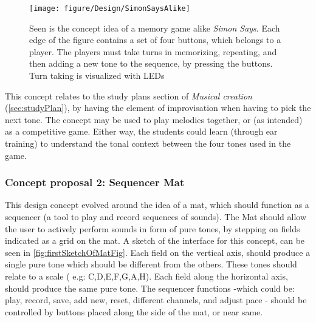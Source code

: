 \begin{figure}[H]
	\centering
	\texttt{[image: figure/Design/SimonSaysAlike]} 
	\caption{Seen is the concept idea of a memory game alike \textit{Simon Says}. Each edge of the figure contains a set of four buttons, which belongs to a player. The players must take turns in memorizing, repeating, and then adding a new tone to the sequence, by pressing the buttons. Turn taking is visualized with LEDs}
	\label{fig:SimonSaysAlike}
\end{figure}

This concept relates to the study plans section of \textit{Musical creation }(\autoref{sec:studyPlan}), by having the element of improvisation when having to pick the next tone. The concept may be used to play melodies together, or (as intended) as a competitive game. Either way, the students could learn (through ear training) to understand the tonal context between the four tones used in the game.   

\subsubsection{Concept proposal 2: Sequencer Mat}\label{sequencerMat}
This design concept evolved around the idea of a mat, which should function as a sequencer (a tool to play and record sequences of sounds). The Mat should allow the user to actively perform sounds in form of pure tones, by stepping on fields indicated as a grid on the mat. A sketch of the interface for this concept, can be seen in \autoref{fig:firstSketchOfMatFig}. Each field on the vertical axis, should produce a single pure tone which should be different from the others. These tones should relate to a scale ( e.g:  C,D,E,F,G,A,H). Each field along the horizontal axis, should produce the same pure tone. The sequencer functions -which could be: play, record, save, add new, reset, different channels, and adjust pace - should be controlled by buttons placed along the side of the mat, or near same.     


